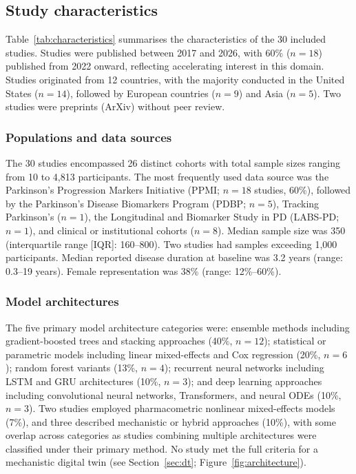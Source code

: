 \documentclass[11pt,a4paper]{article}
\begin{document}
\subsection{Study characteristics}

Table~\ref{tab:characteristics} summarises the characteristics of the 30 included studies. Studies were published between 2017 and 2026, with 60\% ($n=18$) published from 2022 onward, reflecting accelerating interest in this domain. Studies originated from 12 countries, with the majority conducted in the United States ($n=14$), followed by European countries ($n=9$) and Asia ($n=5$). Two studies were preprints (ArXiv) without peer review.

\subsubsection{Populations and data sources}
The 30 studies encompassed 26 distinct cohorts with total sample sizes ranging from 10 to 4,813 participants. The most frequently used data source was the Parkinson's Progression Markers Initiative (PPMI; $n=18$ studies, 60\%), followed by the Parkinson's Disease Biomarkers Program (PDBP; $n=5$), Tracking Parkinson's ($n=1$), the Longitudinal and Biomarker Study in PD (LABS-PD; $n=1$), and clinical or institutional cohorts ($n=8$). Median sample size was 350 (interquartile range [IQR]: 160--800). Two studies had samples exceeding 1,000 participants. Median reported disease duration at baseline was 3.2 years (range: 0.3--19 years). Female representation was 38\% (range: 12\%--60\%).

\subsubsection{Model architectures}
The five primary model architecture categories were: ensemble methods including gradient-boosted trees and stacking approaches (40\%, $n=12$); statistical or parametric models including linear mixed-effects and Cox regression (20\%, $n=6$); random forest variants (13\%, $n=4$); recurrent neural networks including LSTM and GRU architectures (10\%, $n=3$); and deep learning approaches including convolutional neural networks, Transformers, and neural ODEs (10\%, $n=3$). Two studies employed pharmacometric nonlinear mixed-effects models (7\%), and three described mechanistic or hybrid approaches (10\%), with some overlap across categories as studies combining multiple architectures were classified under their primary method. No study met the full criteria for a mechanistic digital twin (see Section~\ref{sec:dt}; Figure~\ref{fig:architecture}).
\end{document}
